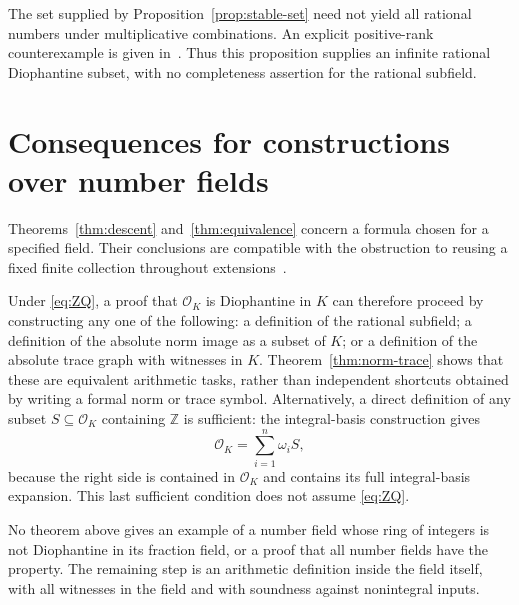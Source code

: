\documentclass[11pt,a4paper]{article}
\theoremstyle{definition}
\newcommand{\Z}{\mathbb Z}
\newcommand{\OK}{\mathcal O_K}
\begin{document}
The set supplied by Proposition~\ref{prop:stable-set} need not yield
all rational numbers under multiplicative combinations. An explicit
positive-rank counterexample is given in~\cite{AbscissaProducts}.
Thus this proposition supplies an infinite rational Diophantine
subset, with no completeness assertion for the rational subfield.

\section{Consequences for constructions over number fields}

Theorems~\ref{thm:descent} and~\ref{thm:equivalence} concern a formula
chosen for a specified field. Their conclusions are compatible with
the obstruction to reusing a fixed finite collection throughout
extensions~\cite{UnchangedFormulas}.

Under \eqref{eq:ZQ}, a proof that $\OK$ is Diophantine in $K$
can therefore proceed by constructing any one of the following:
a definition of the rational subfield; a definition of the
absolute norm image as a subset of $K$; or a definition of the
absolute trace graph with witnesses in $K$.
Theorem~\ref{thm:norm-trace} shows that these are equivalent
arithmetic tasks, rather than independent shortcuts obtained
by writing a formal norm or trace symbol.
Alternatively, a direct definition of any subset $S\subseteq\OK$
containing $\Z$ is sufficient: the integral-basis construction
gives
\[
                    \OK=\sum_{i=1}^n\omega_i S,
\]
because the right side is contained in $\OK$ and contains its
full integral-basis expansion. This last sufficient condition
does not assume \eqref{eq:ZQ}.

No theorem above gives an example of a number field whose ring
of integers is not Diophantine in its fraction field, or a proof
that all number fields have the property. The remaining step is
an arithmetic definition inside the field itself, with all
witnesses in the field and with soundness against nonintegral
inputs.
\end{document}
